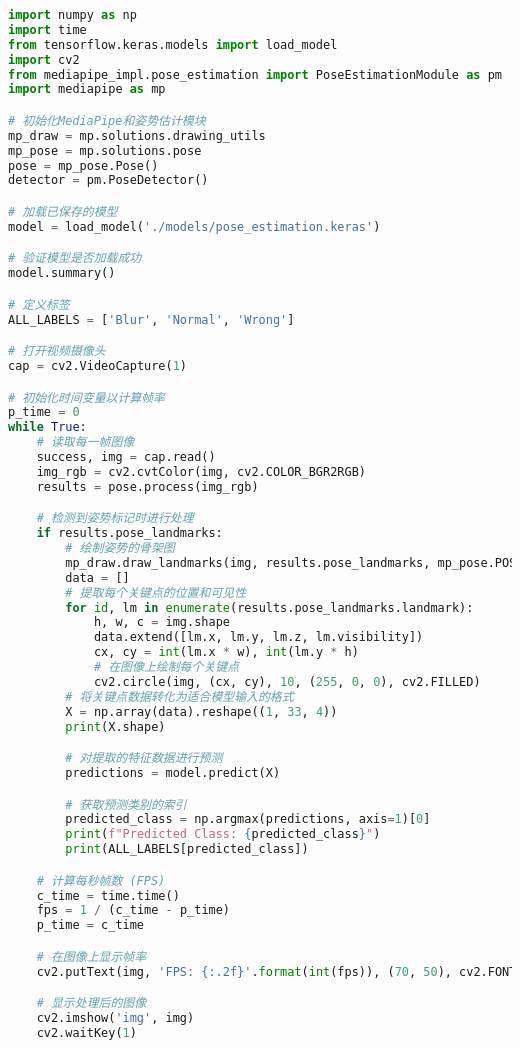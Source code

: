 \begin{lstlisting}[language=Python]
import numpy as np
import time
from tensorflow.keras.models import load_model
import cv2
from mediapipe_impl.pose_estimation import PoseEstimationModule as pm
import mediapipe as mp

# 初始化MediaPipe和姿势估计模块
mp_draw = mp.solutions.drawing_utils
mp_pose = mp.solutions.pose
pose = mp_pose.Pose()
detector = pm.PoseDetector()

# 加载已保存的模型
model = load_model('./models/pose_estimation.keras')

# 验证模型是否加载成功
model.summary()

# 定义标签
ALL_LABELS = ['Blur', 'Normal', 'Wrong']

# 打开视频摄像头
cap = cv2.VideoCapture(1)

# 初始化时间变量以计算帧率
p_time = 0
while True:
    # 读取每一帧图像
    success, img = cap.read()
    img_rgb = cv2.cvtColor(img, cv2.COLOR_BGR2RGB)
    results = pose.process(img_rgb)

    # 检测到姿势标记时进行处理
    if results.pose_landmarks:
        # 绘制姿势的骨架图
        mp_draw.draw_landmarks(img, results.pose_landmarks, mp_pose.POSE_CONNECTIONS)
        data = []
        # 提取每个关键点的位置和可见性
        for id, lm in enumerate(results.pose_landmarks.landmark):
            h, w, c = img.shape
            data.extend([lm.x, lm.y, lm.z, lm.visibility])
            cx, cy = int(lm.x * w), int(lm.y * h)
            # 在图像上绘制每个关键点
            cv2.circle(img, (cx, cy), 10, (255, 0, 0), cv2.FILLED)
        # 将关键点数据转化为适合模型输入的格式
        X = np.array(data).reshape((1, 33, 4))
        print(X.shape)

        # 对提取的特征数据进行预测
        predictions = model.predict(X)

        # 获取预测类别的索引
        predicted_class = np.argmax(predictions, axis=1)[0]
        print(f"Predicted Class: {predicted_class}")
        print(ALL_LABELS[predicted_class])

    # 计算每秒帧数 (FPS)
    c_time = time.time()
    fps = 1 / (c_time - p_time)
    p_time = c_time

    # 在图像上显示帧率
    cv2.putText(img, 'FPS: {:.2f}'.format(int(fps)), (70, 50), cv2.FONT_HERSHEY_PLAIN, 3, (255, 0, 0), 3)

    # 显示处理后的图像
    cv2.imshow('img', img)
    cv2.waitKey(1)
\end{lstlisting}

